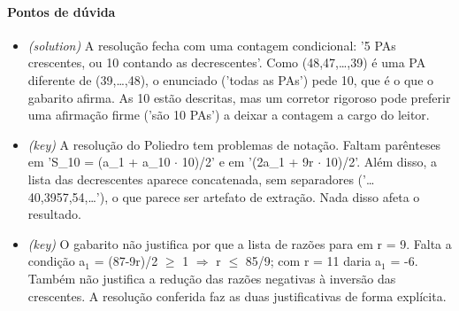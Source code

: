 \documentclass{article}%
\begin{document}
\paragraph{Pontos de dúvida}%
\begin{itemize}%
\item%
\textit{(solution)} A resolução fecha com uma contagem condicional: '5 PAs crescentes, ou 10 contando as decrescentes'. Como (48,47,\ldots{},39) é uma PA diferente de (39,\ldots{},48), o enunciado ('todas as PAs') pede 10, que é o que o gabarito afirma. As 10 estão descritas, mas um corretor rigoroso pode preferir uma afirmação firme ('são 10 PAs') a deixar a contagem a cargo do leitor.%
\item%
\textit{(key)} A resolução do Poliedro tem problemas de notação. Faltam parênteses em 'S\_10 = (a\_1 + a\_10 $\cdot$ 10)/2' e em '(2a\_1 + 9r $\cdot$ 10)/2'. Além disso, a lista das decrescentes aparece concatenada, sem separadores ('\ldots{}40,3957,54,\ldots{}'), o que parece ser artefato de extração. Nada disso afeta o resultado.%
\item%
\textit{(key)} O gabarito não justifica por que a lista de razões para em r = 9. Falta a condição a$_{1}$ = (87-9r)/2 $\geq$ 1 $\Rightarrow$ r $\leq$ 85/9; com r = 11 daria a$_{1}$ = -6. Também não justifica a redução das razões negativas à inversão das crescentes. A resolução conferida faz as duas justificativas de forma explícita.%
\end{itemize}%
\end{document}
